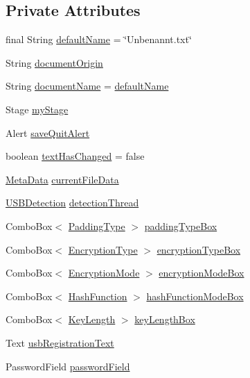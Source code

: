 \subsection*{Private Attributes}
\begin{DoxyCompactItemize}
\item 
final String \mbox{\hyperlink{classlogic_1_1_text_editor_afe454a9184e51274d9c8517214d35fe3}{default\+Name}} = \char`\"{}Unbenannt.\+txt\char`\"{}
\item 
String \mbox{\hyperlink{classlogic_1_1_text_editor_a526595e3a12437964c1b84aa161700ee}{document\+Origin}}
\item 
String \mbox{\hyperlink{classlogic_1_1_text_editor_a14a98b22137de411478049472a854d4c}{document\+Name}} = \mbox{\hyperlink{classlogic_1_1_text_editor_afe454a9184e51274d9c8517214d35fe3}{default\+Name}}
\item 
Stage \mbox{\hyperlink{classlogic_1_1_text_editor_a1744032ec4f1f81cf1450953a9daca21}{my\+Stage}}
\item 
Alert \mbox{\hyperlink{classlogic_1_1_text_editor_a123fc6cb55b7be3b134f9eab544ab7f6}{save\+Quit\+Alert}}
\item 
boolean \mbox{\hyperlink{classlogic_1_1_text_editor_a39b4d4873626fe93955c44e0f236faf5}{text\+Has\+Changed}} = false
\item 
\mbox{\hyperlink{classpersistence_1_1_meta_data}{Meta\+Data}} \mbox{\hyperlink{classlogic_1_1_text_editor_a2d7ebcd9cdb125ce4c6feb1637e384c7}{current\+File\+Data}}
\item 
\mbox{\hyperlink{classlogic_1_1_u_s_b_detection}{U\+S\+B\+Detection}} \mbox{\hyperlink{classlogic_1_1_text_editor_adb15888ec5d957cc8bf3aa7ead49b21c}{detection\+Thread}}
\item 
Combo\+Box$<$ \mbox{\hyperlink{enumenums_1_1_padding_type}{Padding\+Type}} $>$ \mbox{\hyperlink{classlogic_1_1_text_editor_a8511001a70aaa122b8d07998a8aa097c}{padding\+Type\+Box}}
\item 
Combo\+Box$<$ \mbox{\hyperlink{enumenums_1_1_encryption_type}{Encryption\+Type}} $>$ \mbox{\hyperlink{classlogic_1_1_text_editor_a4257d8a1420b6776c104edd8da3d206b}{encryption\+Type\+Box}}
\item 
Combo\+Box$<$ \mbox{\hyperlink{enumenums_1_1_encryption_mode}{Encryption\+Mode}} $>$ \mbox{\hyperlink{classlogic_1_1_text_editor_a72df7a38010ef819f6b1bd05ac5d0463}{encryption\+Mode\+Box}}
\item 
Combo\+Box$<$ \mbox{\hyperlink{enumenums_1_1_hash_function}{Hash\+Function}} $>$ \mbox{\hyperlink{classlogic_1_1_text_editor_a30923a0c85c1393f7cc87e3688193ded}{hash\+Function\+Mode\+Box}}
\item 
Combo\+Box$<$ \mbox{\hyperlink{enumenums_1_1_key_length}{Key\+Length}} $>$ \mbox{\hyperlink{classlogic_1_1_text_editor_a2dc9646e867663bd5681146ec51d201e}{key\+Length\+Box}}
\item 
Text \mbox{\hyperlink{classlogic_1_1_text_editor_ac75c41480833a18c2cfd0f569cf10a45}{usb\+Registration\+Text}}
\item 
Password\+Field \mbox{\hyperlink{classlogic_1_1_text_editor_a61986d9e5914571cf56ad72fa252efb7}{password\+Field}}
\end{DoxyCompactItemize}



